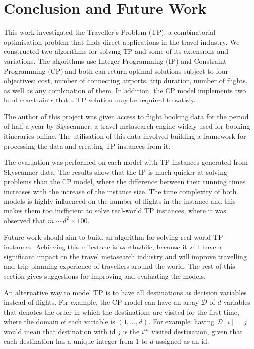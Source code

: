 \documentclass{mpaper}
\begin{document}
\section{Conclusion and Future Work}
\label{conclusionandfuturework}

This work investigated the Traveller's Problem (TP): a combinatorial optimisation problem that finds direct applications in the travel industry.
We constructed two algorithms for solving TP and some of its extensions and variations. The algorithms use Integer Programming (IP) and Constraint Programming (CP) and both can return optimal solutions subject to four objectives: cost, number of connecting airports, trip duration, number of flights, as well as any combination of them. In addition, the CP model implements two hard constraints that a TP solution may be required to satisfy.

The author of this project was given access to flight booking data for the period of half a year by Skyscanner; a travel metasearch engine widely used for booking itineraries online. The utilisation of this data involved building a framework for processing the data and creating TP instances from it.

The evaluation was performed on each model with TP instances generated from Skyscanner data. The results show that the IP is much quicker at solving problems than the CP model, where the difference between their running times increases with the increase of the instance size. The time complexity of both models is highly influenced on the number of flights in the instance and this makes them too inefficient to solve real-world TP instances, where it was observed that $m \sim d^2 \times 100$. 

Future work should aim to build an algorithm for solving real-world TP instances. Achieving this milestone is worthwhile, because it will have a significant impact on the travel metasearch industry and will improve travelling and trip planning experience of travellers around the world.
The rest of this section gives suggestions for improving and evaluating the models.

An alternative way to model TP is to have all destinations as decision variables instead of flights. For example, the CP model can have an array $\mathcal{D}$ of $d$ variables that denotes the order in which the destinations are visited for the first time, where the domain of each variable is $(1,...,d)$. For example, having $\mathcal{D}[i] = j$ would mean that destination with id $j$ is the $i^{th}$ visited destination, given that each destination has a unique integer from $1$ to $d$ assigned as an id.
\end{document}
